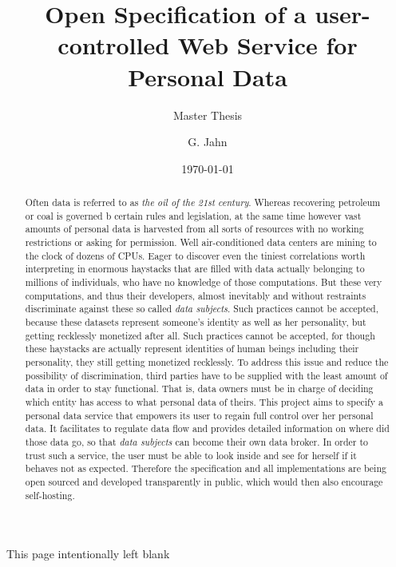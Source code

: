 \documentclass[12pt,english,a4paper,titlepage,cleardoublepage=empty,dottedtoc]{report}
\title{Open Specification of a user-controlled Web Service for Personal Data}
\subtitle{Master Thesis}
\author{G. Jahn}
\date{\today}
\begin{document}
\maketitle
\begin{abstract}
Often data is referred to as \emph{the oil of the 21st century}. Whereas
recovering petroleum or coal is governed b certain rules and
legislation, at the same time however vast amounts of personal data is
harvested from all sorts of resources with no working restrictions or
asking for permission. Well air-conditioned data centers are mining to
the clock of dozens of CPUs. Eager to discover even the tiniest
correlations worth interpreting in enormous haystacks that are filled
with data actually belonging to millions of individuals, who have no
knowledge of those computations. But these very computations, and thus
their developers, almost inevitably and without restraints discriminate
against these so called \emph{data subjects}. Such practices cannot be
accepted, because these datasets represent someone's identity as well as
her personality, but getting recklessly monetized after all. Such
practices cannot be accepted, for though these haystacks are actually
represent identities of human beings including their personality, they
still getting monetized recklessly. To address this issue and reduce the
possibility of discrimination, third parties have to be supplied with
the least amount of data in order to stay functional. That is, data
owners must be in charge of deciding which entity has access to what
personal data of theirs. This project aims to specify a personal data
service that empowers its user to regain full control over her personal
data. It facilitates to regulate data flow and provides detailed
information on where did those data go, so that \emph{data subjects} can
become their own data broker. In order to trust such a service, the user
must be able to look inside and see for herself if it behaves not as
expected. Therefore the specification and all implementations are being
open sourced and developed transparently in public, which would then
also encourage self-hosting.
\end{abstract}

{
\setcounter{tocdepth}{1}
\tableofcontents
}
\newpage
\listoftables
\newpage
\listoffigures
\newpage

\begin{center}
This page intentionally left blank
\end{center}\newpage
\end{document}
